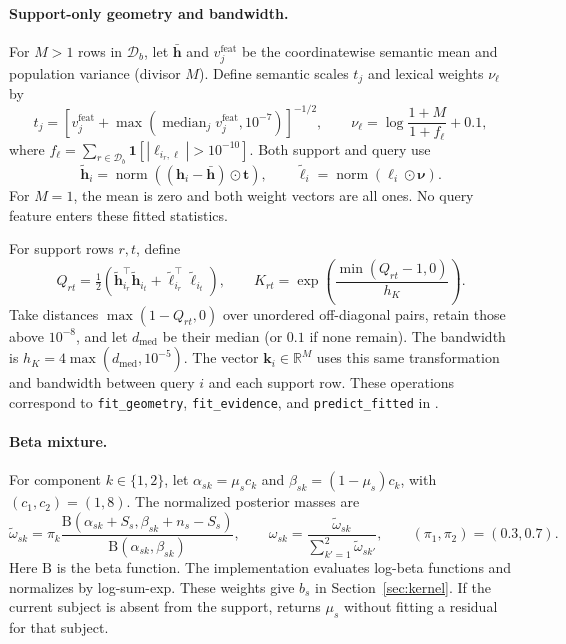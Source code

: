 \documentclass{article}
\begin{document}
\paragraph{Support-only geometry and bandwidth.}
For $M>1$ rows in $\mathcal D_b$, let $\bar{\mathbf h}$ and $v_j^{\mathrm{feat}}$ be the coordinatewise semantic mean and population variance (divisor $M$). Define semantic scales $t_j$ and lexical weights $\nu_\ell$ by
\[
 t_j=\left[v_j^{\mathrm{feat}}+\max(\operatorname{median}_j v_j^{\mathrm{feat}},10^{-7})\right]^{-1/2},\qquad
 \nu_\ell=\log\frac{1+M}{1+f_\ell}+0.1,
\]
where $f_\ell=\sum_{r\in\mathcal D_b}\mathbf1[|\ell_{i_r,\ell}|>10^{-10}]$. Both support and query use
\[
 \widetilde{\mathbf h}_i=\operatorname{norm}((\mathbf h_i-\bar{\mathbf h})\odot\mathbf t),\qquad
 \widetilde{\boldsymbol\ell}_i=\operatorname{norm}(\boldsymbol\ell_i\odot\boldsymbol\nu).
\]
For $M=1$, the mean is zero and both weight vectors are all ones. No query feature enters these fitted statistics.

For support rows $r,t$, define
\[
 Q_{rt}=\tfrac12\left(\widetilde{\mathbf h}_{i_r}^{\top}\widetilde{\mathbf h}_{i_t}
 +\widetilde{\boldsymbol\ell}_{i_r}^{\top}\widetilde{\boldsymbol\ell}_{i_t}\right),\qquad
 K_{rt}=\exp\!\left(\frac{\min(Q_{rt}-1,0)}{h_K}\right).
\]
Take distances $\max(1-Q_{rt},0)$ over unordered off-diagonal pairs, retain those above $10^{-8}$, and let $d_{\mathrm{med}}$ be their median (or $0.1$ if none remain). The bandwidth is $h_K=4\max(d_{\mathrm{med}},10^{-5})$. The vector $\mathbf k_i\in\mathbb R^M$ uses this same transformation and bandwidth between query $i$ and each support row. These operations correspond to \texttt{fit\_geometry}, \texttt{fit\_evidence}, and \texttt{predict\_fitted} in .

\paragraph{Beta mixture.}
For component $k\in\{1,2\}$, let $\alpha_{sk}=\mu_sc_k$ and $\beta_{sk}=(1-\mu_s)c_k$, with $(c_1,c_2)=(1,8)$. The normalized posterior masses are
\[
 \widetilde\omega_{sk}=\pi_k
 \frac{\mathrm B(\alpha_{sk}+S_s,\beta_{sk}+n_s-S_s)}{\mathrm B(\alpha_{sk},\beta_{sk})},\qquad
 \omega_{sk}=\frac{\widetilde\omega_{sk}}{\sum_{k'=1}^{2}\widetilde\omega_{sk'}},\qquad
 (\pi_1,\pi_2)=(0.3,0.7).
\]
Here $\mathrm B$ is the beta function. The implementation evaluates log-beta functions and normalizes by log-sum-exp. These weights give $b_s$ in Section~\ref{sec:kernel}. If the current subject is absent from the support,  returns $\mu_s$ without fitting a residual for that subject.
\end{document}
